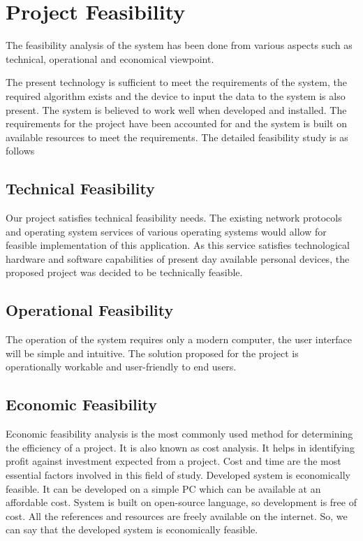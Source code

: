 \section{Project Feasibility}
The feasibility analysis of the system has been done from various aspects such as technical, operational and economical viewpoint. \par
The present technology is sufficient to meet the requirements of the system, the required algorithm exists and the device to input the data to the system is also present. The system is believed to work well when developed and installed. The requirements for the project have been accounted for and the system is built on available resources to meet the requirements. The detailed feasibility study is as follows

\subsection{Technical Feasibility}
Our project satisfies technical feasibility needs. The existing network
protocols and operating system services of various operating systems would allow for feasible implementation of this application. As this service satisfies technological hardware and software capabilities of present day available personal devices, the proposed project was decided to be technically feasible.
\subsection{Operational Feasibility}
The operation of the system requires only a modern computer, the user interface will be simple and intuitive. The solution proposed for the project is operationally workable and user-friendly to end users.
\subsection{Economic Feasibility}
Economic feasibility analysis is the most commonly used method for determining the efficiency of a project. It is also known as cost analysis. It helps in identifying profit against investment expected from a project. Cost and time are the most essential factors involved in this field of study. Developed system is economically feasible. It can be developed on a simple PC which can be available at an affordable cost. System is built on open-source language, so development is free of cost. All the references and resources are freely available on the internet. So, we can say that the developed system is economically feasible.


